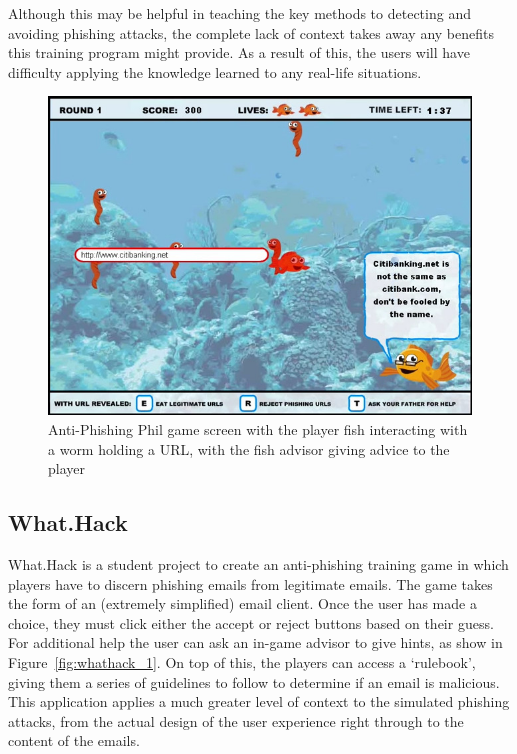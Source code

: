 \documentclass{l4proj}
\begin{document}
Although this may be helpful in teaching the key methods to detecting and avoiding phishing attacks, the complete lack of context takes away any benefits this training program might provide. As a result of this, the users will have difficulty applying the knowledge learned to any real-life situations. 

\begin{figure}[H]
    \centering
    \includegraphics[width=0.9\linewidth]{images/antiphishingphil.png}   
    \caption{Anti-Phishing Phil game screen with the player fish interacting with a worm holding a URL, with the fish advisor giving advice to the player}
    \label{fig:antiphishingphil} 
\end{figure}

\subsection{What.Hack}
What.Hack \citep{wen2019hack} is a student project to create an anti-phishing training game in which players have to discern phishing emails from legitimate emails. The game takes the form of an (extremely simplified) email client. Once the user has made a choice, they must click either the accept or reject buttons based on their guess. For additional help the user can ask an in-game advisor to give hints, as show in Figure~\ref{fig:whathack_1}. On top of this, the players can access a ‘rulebook’, giving them a series of guidelines to follow to determine if an email is malicious. This application applies a much greater level of context to the simulated phishing attacks, from the actual design of the user experience right through to the content of the emails. 
\end{document}
